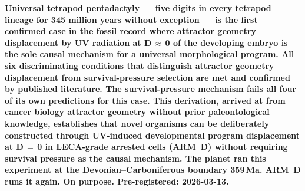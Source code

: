 \documentclass[11pt, a4paper]{article}
\begin{document}
\begin{mdframed}[
  backgroundcolor=boxblue,
  linecolor=boxblue,
  linewidth=0pt,
  innertopmargin=0.6em,
  innerbottommargin=0.6em,
  innerleftmargin=1em,
  innerrightmargin=1em
]
\begin{center}
\small\bfseries\color{white}
Universal tetrapod pentadactyly --- five digits
in every tetrapod lineage for 345 million years
without exception --- is the first confirmed case
in the fossil record where attractor geometry
displacement by UV radiation at D\,$\approx$\,0
of the developing embryo is the sole causal
mechanism for a universal morphological program.
All six discriminating conditions that distinguish
attractor geometry displacement from survival-pressure
selection are met and confirmed by published
literature. The survival-pressure mechanism fails
all four of its own predictions for this case.
This derivation, arrived at from cancer biology
attractor geometry without prior paleontological
knowledge, establishes that novel organisms can be
deliberately constructed through UV-induced
developmental program displacement at D\,$=$\,0
in LECA-grade arrested cells (ARM~D) without
requiring survival pressure as the causal mechanism.
The planet ran this experiment at the
Devonian--Carboniferous boundary 359\,Ma.
ARM~D runs it again. On purpose.
Pre-registered: 2026-03-13.
\end{center}
\end{mdframed}

\vspace{1em}
\end{document}

